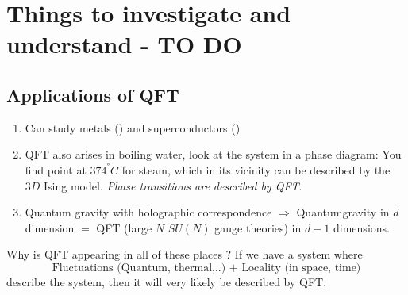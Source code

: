 \chapter{Things to investigate and understand - TO DO}
\section{Applications of QFT}
\begin{enumerate}
	\item Can study metals () and superconductors () 
	\item QFT also arises in boiling water, look at the system in a phase diagram: You find point at $374^° C$ for steam, which in its vicinity can be described by the $3D$ Ising model. \emph{Phase transitions are described by QFT}.
	\item Quantum gravity with holographic correspondence $\Rightarrow$ Quantumgravity in $d$ dimension $=$ QFT (large $N$ $SU(N)$ gauge theories) in $d-1$ dimensions.
\end{enumerate}
\begin{mybox}{Why is QFT appearing in all of these places ?}
	If we have a system where 
	\begin{equation*}
		\text{Fluctuations (Quantum, thermal,..) } + \text{ Locality (in space, time)}
	\end{equation*}
describe the system, then it will very likely be described by QFT.
\end{mybox}
